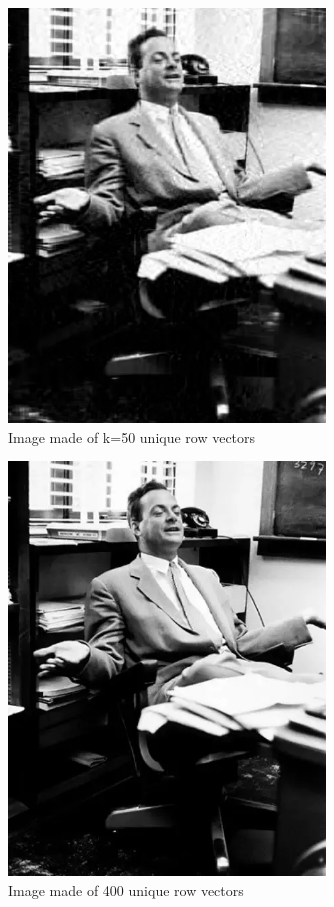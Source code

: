       \begin{figure}[h!]
      	\centering
      	\includegraphics[width=0.75\textwidth]{imm/svd/50vettori.png} 	\caption{Image made of k=50 unique row vectors
      	} 
      	\label{k50}
      \end{figure}
      
        \begin{figure}[h!]
        	\centering
        	\includegraphics[width=0.75\textwidth]{imm/svd/400vettori.png} 	\caption{Image made of 400 unique row vectors
        	} 
        	\label{k400}
        \end{figure}
      \clearpage

